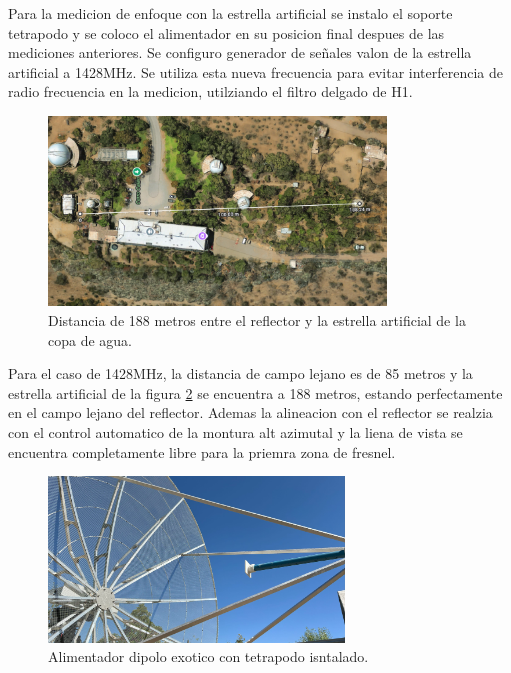 Para la medicion de enfoque con la estrella artificial se instalo el soporte tetrapodo y se coloco el alimentador en su posicion final despues de las mediciones anteriores. Se configuro generador de señales valon de la estrella artificial a 1428MHz. Se utiliza esta nueva frecuencia para evitar interferencia de radio frecuencia en la medicion, utilziando el filtro delgado de H1.\\

\begin{figure}
    \centering
    \includegraphics[width=0.8\textwidth]{img/188m_measure}
    \caption{Distancia de 188 metros entre el reflector y la estrella artificial de la copa de agua.}
    \label{fig:enfoque2}
\end{figure}

Para el caso de 1428MHz, la distancia de campo lejano es de 85 metros y la estrella artificial de la figura \ref{fig:enfoque2} se encuentra a 188 metros, estando perfectamente en el campo lejano del reflector. Ademas la alineacion con el reflector se realzia con el control automatico de la montura alt azimutal y la liena de vista se encuentra completamente libre para la priemra zona de fresnel.\\

\begin{figure}
    \centering
    \includegraphics[width=0.7\textwidth]{img/feed_focus}
    \caption{Alimentador dipolo exotico con tetrapodo isntalado.}
    \label{fig:enfoque2}
\end{figure}

